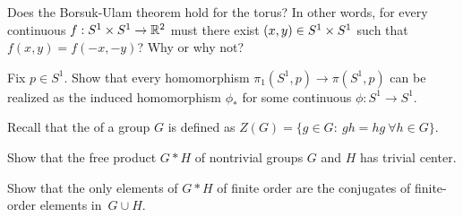 \prob [Hatcher p.38 \#8] Does the Borsuk-Ulam theorem hold for the torus?  In other words, for every continuous $f:S^1\times S^1\to\mathbb{R}^2$ must there exist $(x,y)\in S^1\times S^1$ such that $f(x,y)=f(-x,-y)$?  Why or why not?

\prob [Hatcher p.39 \#12] Fix $p\in S^1$.  Show that every homomorphism $\pi_1(S^1,p)\to\pi(S^1,p)$ can be realized as the induced homomorphism $\phi_*$ for some continuous $\phi:S^1\to S^1$.

\prob [Hatcher, p.52, \#1]  Recall that the  of a group $G$ is defined as $Z(G)=\{g\in G:\ gh=hg \ \forall h\in G\}$.

\probpart Show that the free product $G*H$ of nontrivial groups $G$ and $H$ has trivial center.

\probpart Show that the only elements of $G*H$ of finite order are the conjugates of finite-order elements in~$G\cup H$.


